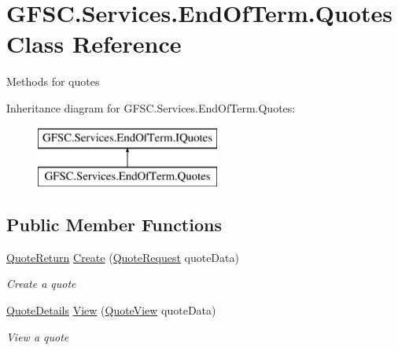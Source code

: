 \hypertarget{class_g_f_s_c_1_1_services_1_1_end_of_term_1_1_quotes}{}\section{G\+F\+S\+C.\+Services.\+End\+Of\+Term.\+Quotes Class Reference}
\label{class_g_f_s_c_1_1_services_1_1_end_of_term_1_1_quotes}


Methods for quotes  


Inheritance diagram for G\+F\+S\+C.\+Services.\+End\+Of\+Term.\+Quotes\+:\begin{figure}[H]
\begin{center}
\leavevmode
\includegraphics[height=2.000000cm]{class_g_f_s_c_1_1_services_1_1_end_of_term_1_1_quotes}
\end{center}
\end{figure}
\subsection*{Public Member Functions}
\begin{DoxyCompactItemize}
\item 
\mbox{\hyperlink{class_g_f_s_c_1_1_services_1_1_end_of_term_1_1_quote_return}{Quote\+Return}} \mbox{\hyperlink{class_g_f_s_c_1_1_services_1_1_end_of_term_1_1_quotes_a382f58b87dd3cd8fa745e9c77f7d6d13}{Create}} (\mbox{\hyperlink{class_g_f_s_c_1_1_services_1_1_end_of_term_1_1_quote_request}{Quote\+Request}} quote\+Data)
\begin{DoxyCompactList}\small\item\em Create a quote \end{DoxyCompactList}\item 
\mbox{\hyperlink{class_g_f_s_c_1_1_services_1_1_end_of_term_1_1_quote_details}{Quote\+Details}} \mbox{\hyperlink{class_g_f_s_c_1_1_services_1_1_end_of_term_1_1_quotes_a68db0939e495f84025bf01b6ef4fbc2a}{View}} (\mbox{\hyperlink{class_g_f_s_c_1_1_services_1_1_end_of_term_1_1_quote_view}{Quote\+View}} quote\+Data)
\begin{DoxyCompactList}\small\item\em View a quote \end{DoxyCompactList}\end{DoxyCompactItemize}
